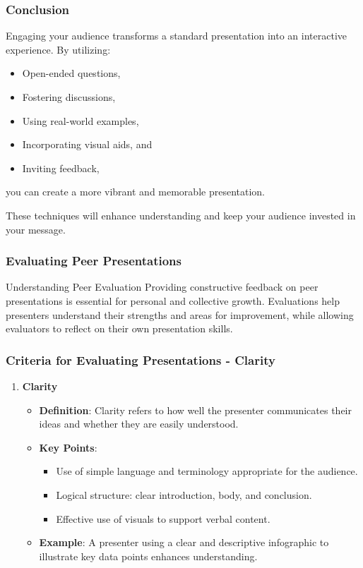 \documentclass[aspectratio=169]{beamer}
\begin{document}
\begin{frame}[fragile]
    \frametitle{Conclusion}
    
    Engaging your audience transforms a standard presentation into an interactive experience. 
    By utilizing:
    \begin{itemize}
        \item Open-ended questions,
        \item Fostering discussions,
        \item Using real-world examples,
        \item Incorporating visual aids, and
        \item Inviting feedback,
    \end{itemize}
    you can create a more vibrant and memorable presentation. 

    These techniques will enhance understanding and keep your audience invested in your message.
\end{frame}

\begin{frame}[fragile]
    \frametitle{Evaluating Peer Presentations}
    \begin{block}{Understanding Peer Evaluation}
        Providing constructive feedback on peer presentations is essential for personal and collective growth. Evaluations help presenters understand their strengths and areas for improvement, while allowing evaluators to reflect on their own presentation skills.
    \end{block}
\end{frame}

\begin{frame}[fragile]
    \frametitle{Criteria for Evaluating Presentations - Clarity}
    \begin{enumerate}
        \item \textbf{Clarity}
            \begin{itemize}
                \item \textbf{Definition}: Clarity refers to how well the presenter communicates their ideas and whether they are easily understood.
                \item \textbf{Key Points}:
                    \begin{itemize}
                        \item Use of simple language and terminology appropriate for the audience.
                        \item Logical structure: clear introduction, body, and conclusion.
                        \item Effective use of visuals to support verbal content.
                    \end{itemize}
                \item \textbf{Example}: A presenter using a clear and descriptive infographic to illustrate key data points enhances understanding.
            \end{itemize}
    \end{enumerate}
\end{frame}
\end{document}
